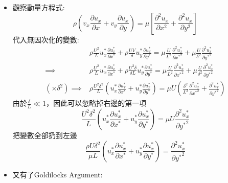 \documentclass[../main.tex]{subfiles}
\begin{document}
\begin{itemize}
\begin{itemize}
\begin{equation}
    \end{equation}
    \item 觀察動量方程式:
    \begin{equation}
      \rho\left(
        v_x \frac{\partial u_x}{\partial x} +
        v_y \frac{\partial u_x}{\partial y}
      \right) = \mu\left[
        \frac{\partial^2 u_x}{\partial x^2} +
        \frac{\partial^2 u_x}{\partial y^2}
      \right]
    \end{equation}
    代入無因次化的變數:
    \begin{align}
      &\rho
        \frac{U^2}{L} u_x^\ast \frac{\partial u_x^\ast}{\partial x^\ast} +
       \rho \frac{UV}{\delta} u_y^\ast \frac{\partial u_x^\ast}{\partial y^\ast}  = 
        \mu \frac{U}{L^2} \frac{\partial^2 u_x^\ast}{\partial {x^\ast}^2} +
        \mu \frac{U}{\delta^2} \frac{\partial^2 u_x^\ast}{\partial {y^\ast}^2}
      \nonumber\\
      \implies&\rho
        \frac{U^2}{L} u_x^\ast \frac{\partial u_x^\ast}{\partial x^\ast} +
       \rho \frac{U^2 \delta}{\delta L} u_y^\ast \frac{\partial u_x^\ast}{\partial y^\ast}  = 
        \mu \frac{U}{L^2} \frac{\partial^2 u_x^\ast}{\partial {x^\ast}^2} +
        \mu \frac{U}{\delta^2} \frac{\partial^2 u_x^\ast}{\partial {y^\ast}^2}
      \nonumber\\
     (\times \delta^2)\implies &\rho
        \frac{U^2\delta^2}{L} \left(
          u_x^\ast \frac{\partial u_x^\ast}{\partial x^\ast} +
          u_y^\ast \frac{\partial u_x^\ast}{\partial y^\ast}
        \right) =
        \mu U \left(
          \frac{\delta^2}{L^2} \frac{\partial^2 u_x^\ast}{\partial {x^\ast}^2} +
          \frac{\partial^2 u_x^\ast}{\partial {y^\ast}^2}
        \right)
    \end{align}
    由於$\frac{\delta}{L} \ll 1$，因此可以忽略掉右邊的第一項
    \begin{equation}
      \frac{U^2\delta^2}{L} \left(
          u_x^\ast \frac{\partial u_x^\ast}{\partial x^\ast} +
          u_y^\ast \frac{\partial u_x^\ast}{\partial y^\ast}
        \right) =
        \mu U \frac{\partial^2 u_x^\ast}{\partial {y^\ast}^2}
    \end{equation}
    把變數全部扔到左邊
    \begin{equation}
      \frac{\rho U\delta^2}{\mu L}\left(
        u_x^\ast \frac{\partial u_x^\ast}{\partial x^\ast} +
        u_y^\ast \frac{\partial u_x^\ast}{\partial y^\ast}
      \right) = \frac{\partial^2 u_x^\ast}{\partial {y^\ast}^2}
    \end{equation}
  \item 又有了Goldilocks Argument:\\

\end{itemize}
\end{itemize}
\end{document}
